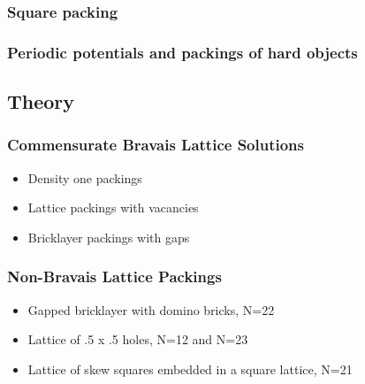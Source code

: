 \documentclass[11pt]{article}
\begin{document}
\subsubsection{Square packing}
\label{sec-6.1.2}

\subsubsection{Periodic potentials and packings of hard objects}
\label{sec-6.1.3}

\subsection{Theory}
\label{sec-6.2}

\subsubsection{Commensurate Bravais Lattice Solutions}
\label{sec-6.2.1}

\begin{itemize}

\item Density one packings\\
\label{sec-6.2.1.1}


\item Lattice packings with vacancies\\
\label{sec-6.2.1.2}


\item Bricklayer packings with gaps\\
\label{sec-6.2.1.3}

\end{itemize} %
\subsubsection{Non-Bravais Lattice Packings}
\label{sec-6.2.2}

\begin{itemize}

\item Gapped bricklayer with domino bricks, N=22\\
\label{sec-6.2.2.1}


\item Lattice of .5 x .5 holes, N=12 and N=23\\
\label{sec-6.2.2.2}


\item Lattice of skew squares embedded in a square lattice, N=21\\
\label{sec-6.2.2.3}

\end{itemize} %
\end{document}
